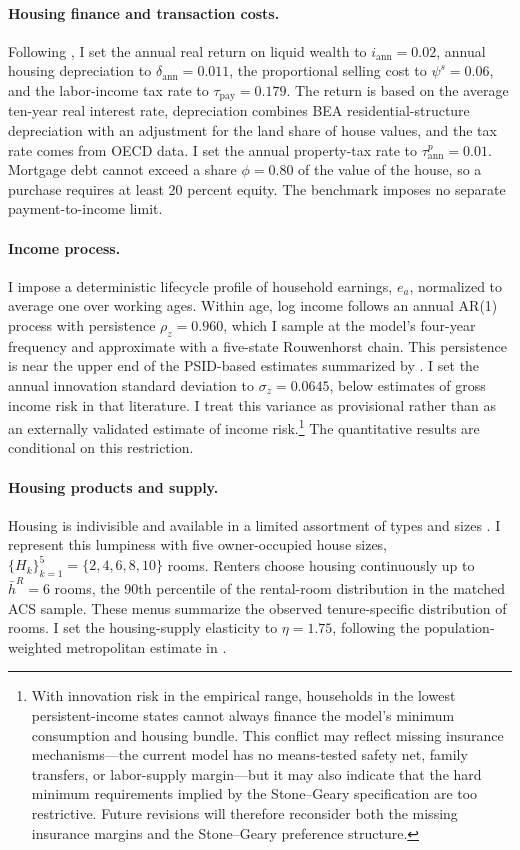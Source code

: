 \paragraph{Housing finance and transaction costs.}
Following \citet{greaneyDynamicUrbanEconomics2025}, I set the annual real
return on liquid wealth to $i_{\mathrm{ann}}=0.02$, annual housing depreciation
to $\delta_{\mathrm{ann}}=0.011$, the proportional selling cost to
$\psi^s=0.06$, and the labor-income tax rate to
$\tau_{\mathrm{pay}}=0.179$. The return is based on the average ten-year real
interest rate, depreciation combines BEA residential-structure depreciation
with an adjustment for the land share of house values, and the tax rate comes
from OECD data. I set the annual property-tax rate to
$\tau^p_{\mathrm{ann}}=0.01$. Mortgage debt cannot exceed a share $\phi=0.80$
of the value of the house, so a purchase requires at least 20 percent equity.
The benchmark imposes no separate payment-to-income limit.

\paragraph{Income process.}
I impose a deterministic lifecycle profile of household earnings, $e_a$,
normalized to average one over working ages. Within age, log income follows an
annual AR(1) process with persistence $\rho_z=0.960$, which I sample at the
model's four-year frequency and approximate with a five-state Rouwenhorst
chain. This persistence is near the upper end of the PSID-based estimates
summarized by \citet{sommerImplicationsUSTax2018}. I set the annual innovation
standard deviation to $\sigma_z=0.0645$, below estimates of gross income risk
in that literature. I treat this variance as provisional rather than as an
externally validated estimate of income risk.\footnote{With innovation risk in
the empirical range, households in the lowest persistent-income states cannot
always finance the model's minimum consumption and housing bundle. This
conflict may reflect missing insurance mechanisms---the current model has no
means-tested safety net, family transfers, or labor-supply margin---but it may
also indicate that the hard minimum requirements implied by the Stone--Geary
specification are too restrictive. Future revisions will therefore reconsider
both the missing insurance margins and the Stone--Geary preference structure.}
The quantitative results are conditional on this restriction.

\paragraph{Housing products and supply.}
Housing is indivisible and available in a limited assortment of types and
sizes \citep{davisHousingFinanceMacroeconomy2015}. I represent this lumpiness
with five owner-occupied house sizes,
$\{H_k\}_{k=1}^5=\{2,4,6,8,10\}$ rooms. Renters choose housing continuously up
to $\bar h^R=6$ rooms, the 90th percentile of the rental-room distribution in
the matched ACS sample. These menus summarize the observed tenure-specific
distribution of rooms. I set the
housing-supply elasticity to $\eta=1.75$, following the population-weighted
metropolitan estimate in \citet{saizGeographicDeterminantsHousing2010}.

